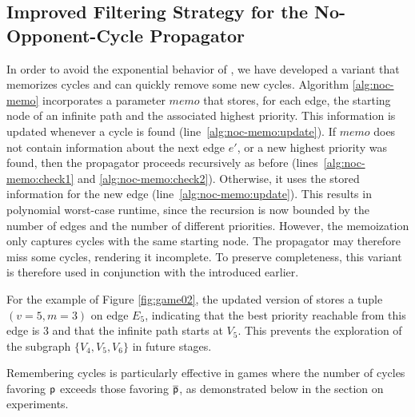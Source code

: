\documentclass[letterpaper]{article} %
\begin{document}
\subsection{Improved Filtering Strategy for the No-Opponent-Cycle Propagator}

In order to avoid the exponential behavior of \noceager, we have developed a variant that memorizes cycles and can quickly remove some new cycles. Algorithm \ref{alg:noc-memo} incorporates a parameter $\textit{memo}$ that stores, for each edge, the starting node of an infinite path and the associated highest priority. This information is updated whenever a cycle is found (line~\ref{alg:noc-memo:update}). If $\textit{memo}$ does not contain information about the next edge $e'$, or a new highest priority was found, then the propagator proceeds recursively as before (lines~\ref{alg:noc-memo:check1} and \ref{alg:noc-memo:check2}). Otherwise, it uses the stored information for the new edge (line~\ref{alg:noc-memo:update}). 
This results in polynomial worst-case runtime, since the recursion is now bounded by the number of edges and the number of different priorities. However, the memoization only captures cycles with the same starting node. The propagator may therefore miss some cycles, rendering it incomplete. To preserve completeness, this variant is therefore used in conjunction with the \nocchecker introduced earlier.

For the example of Figure \ref{fig:game02}, the updated version of \noc stores a tuple $(v=5, m=3)$ on edge $E_5$, indicating that the best priority reachable from this edge is 3 and that the infinite path starts at $V_5$. This prevents the exploration of the subgraph $\{V_4, V_5, V_6\}$ in future stages. %

Remembering cycles is particularly effective in games where the number of cycles favoring $\player$ exceeds those favoring $\opponent$, as demonstrated below in the section on experiments.
\end{document}

